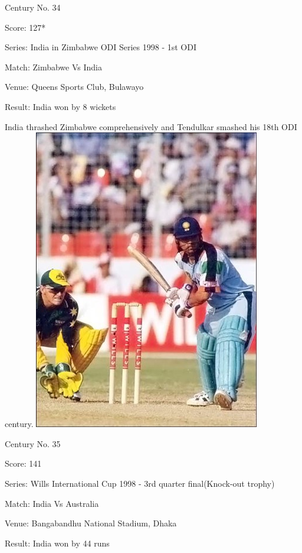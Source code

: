 \documentclass[11pt, a4paper]{article}
\begin{document}
Century No. 34

Score: 127*

Series: India in Zimbabwe ODI Series 1998 - 1st ODI

Match: Zimbabwe Vs India

Venue: Queens Sports Club, Bulawayo

Result: India won by 8 wickets

India thrashed Zimbabwe comprehensively and Tendulkar smashed his 18th ODI century.
\newpage
\includegraphics[height=0.8\textheight]{pics/35.jpg}

Century No. 35

Score: 141

Series: Wills International Cup 1998 - 3rd quarter final(Knock-out trophy)

Match: India Vs Australia

Venue: Bangabandhu National Stadium, Dhaka

Result: India won by 44 runs
\end{document}
